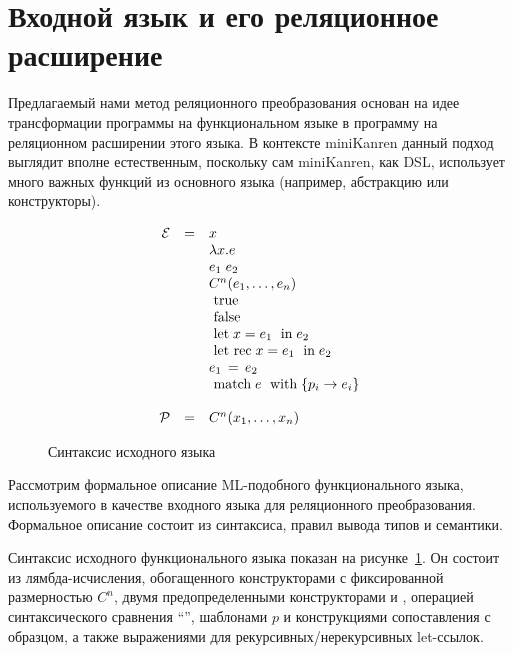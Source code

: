 \section{Входной язык и его реляционное расширение}

Предлагаемый нами метод реляционного преобразования основан на идее трансформации программы на функциональном языке в программу на реляционном расширении этого языка. 
В контексте miniKanren данный подход выглядит вполне естественным, поскольку сам miniKanren, как DSL, использует много важных функций из основного языка (например, абстракцию или конструкторы).

\begin{figure}
\centering
$$
\begin{array}{rcl}
 \mathcal E &=&x\\
     & &\lambda x.e\\
     & &e_1\;e_2\\
     & &C^n(e_1,\dots, e_n)\\
     & &\inmath{true}\\
     & &\inmath{false}\\
     & &\Let{x}{e_1}{e_2}\\
     & &\LetR{x}{e_1}{e_2}\\
     & &e_1\,=\,e_2\\
     & &\Match{e}{p_i}{e_i}\\
     & &\\
 \mathcal P &=&C^n(x_1,\dots,x_n)\\
\end{array}
$$
\caption{Синтаксис исходного языка}
\label{functional_syntax}
\end{figure}

Рассмотрим формальное описание ML-подобного функционального языка, используемого в качестве входного языка для реляционного преобразования. Формальное описание состоит из синтаксиса, правил вывода типов и семантики.

Синтаксис исходного функционального языка показан на рисунке~\ref{functional_syntax}.
Он состоит из лямбда-исчисления, обогащенного конструкторами с фиксированной размерностью $C^n$, двумя предопределенными конструкторами  и , операцией синтаксического сравнения ``\code{=}'', шаблонами $p$ и конструкциями сопоставления с образцом, а также выражениями для рекурсивных/нерекурсивных let-ссылок.

